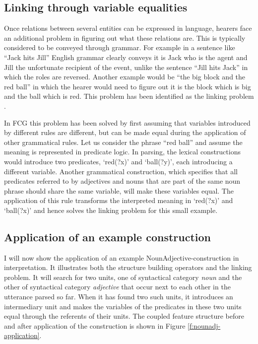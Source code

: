 \subsection{Linking through variable equalities}

Once relations between several entities can be expressed in language,
hearers face an additional problem in figuring out what these
relations are. This is typically considered to be conveyed through
grammar. For example in a sentence like ``Jack hits Jill'' English
grammar clearly conveys it is Jack who is the agent and Jill the
unfortunate recipient of the event, unlike the sentence ``Jill hits
Jack'' in which the roles are reversed. Another example would be ``the
big block and the red ball'' in which the hearer would need to figure
out it is the block which is big and the ball which is red. This
problem has been identified as the linking problem
\citep{steels05linking}.

In FCG this problem has been solved by first assuming that variables
introduced by different rules are different, but can be made equal
during the application of other grammatical rules. Let us consider the
phrase ``red ball'' and assume the meaning is represented in predicate
logic. In parsing, the lexical constructions would introduce two
predicates, `red(?x)' and `ball(?y)', each introducing a different
variable. Another grammatical construction, which specifies that all
predicates referred to by adjectives and nouns that are part of the
same noun phrase should share the same variable, will make these
variables equal. The application of this rule transforms the
interpreted meaning in `red(?x)' and `ball(?x)' and hence solves the
linking problem for this small example.

\subsection{Application of an example construction}

I will now show the application of an example
NounAdjective-construction in interpretation. It illustrates both the
structure building operators and the linking problem. It will search
for two units, one of syntactical category \emph{noun} and the other
of syntactical category \emph{adjective} that occur next to each other
in the utterance parsed so far. When it has found two such units, it
introduces an intermediary unit and makes the variables of the
predicates in these two units equal through the referents of their
units. The coupled feature structure before and after application of
the construction is shown in Figure \ref{f:nounadj-application}.

